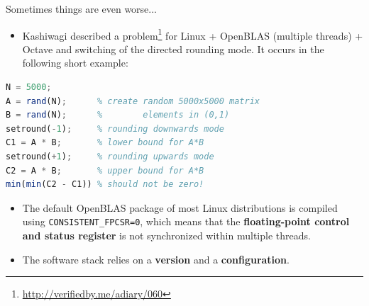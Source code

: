 \documentclass[xcolor=svgnames,xcolor=table,aspectratio=169]{beamer}
\begin{document}
\begin{frame}[fragile]{Sometimes things are even worse...}
\begin{itemize}
\item
Kashiwagi described a problem\footnote{\url{http://verifiedby.me/adiary/060}}
for Linux + OpenBLAS ({\color{DarkRed}multiple threads}) + Octave
and switching of the directed rounding mode.
It occurs in the following short example:
\end{itemize}

\begin{lstlisting}[language=Octave,xleftmargin=5em]
N = 5000;
A = rand(N);      % create random 5000x5000 matrix
B = rand(N);      %        elements in (0,1)
setround(-1);     % rounding downwards mode
C1 = A * B;       % lower bound for A*B
setround(+1);     % rounding upwards mode
C2 = A * B;       % upper bound for A*B
min(min(C2 - C1)) % should not be zero!
\end{lstlisting}

\begin{itemize}
\item
The default OpenBLAS package of most Linux distributions is compiled using
{\color{DarkRed}\texttt{CONSISTENT\_FPCSR=0}}, which means that the
\textbf{floating-point control and status register}
is not synchronized within multiple threads.

\item
{\color{DarkRed}
The software stack relies on a \textbf{version} and a \textbf{configuration}.}
\end{itemize}
\end{frame}
\end{document}
